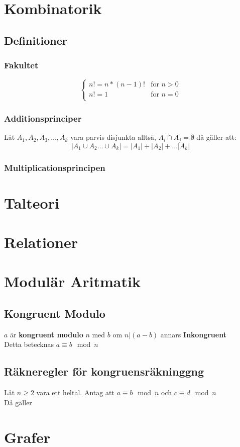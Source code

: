 \documentclass{article}
\begin{document}
	\section{Kombinatorik}
	\subsection{Definitioner}
	\subsubsection{Fakultet}
	$$
	\begin{cases}
		n! = n * (n - 1)! & \text{for }n > 0\\    
		n! = 1 & \text{for } n = 0\\
	\end{cases}
	$$
	\subsubsection{Additionsprinciper}
	Låt $A_1, A_2, A_3, \dots ,A_k$ vara parvis disjunkta alltså, $A_i \cap A_j = \emptyset$ då gäller att:
	$$
		|A_1 \cup A_2 \dots \cup A_k| = |A_1| + |A_2| + \dots |A_k|
	$$
	\subsubsection{Multiplicationsprincipen}


	\section{Talteori}

	\section{Relationer}

	\section{Modulär Aritmatik}
	
	\subsection{Kongruent Modulo}
	$a$ är \textbf{kongruent modulo} $n$ med $b$ om $n | (a-b)$ annars \textbf{Inkongruent} \\
	Detta betecknas	$a \equiv b \mod n$

	\subsection{Räkneregler för kongruensräkninggng}
	Låt $n \geq 2$ vara ett heltal. Antag att $a \equiv b \mod n$ och $c \equiv d \mod n$ \\
	Då gäller

	\section{Grafer}
\end{document}
